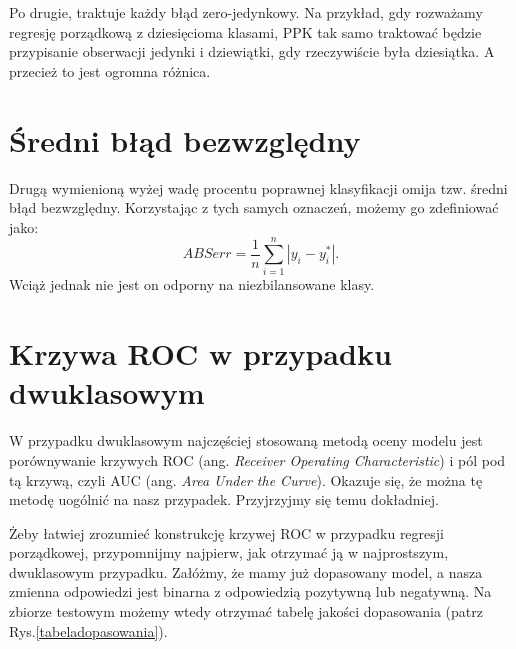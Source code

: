 \documentclass{mini}
\begin{document}
Po drugie, traktuje każdy błąd zero-jedynkowy. Na przykład, gdy rozważamy regresję porządkową z dziesięcioma klasami, PPK tak samo traktować będzie przypisanie obserwacji jedynki i dziewiątki, gdy rzeczywiście była dziesiątka. A przecież to jest ogromna różnica.

\section{Średni błąd bezwzględny}

Drugą wymienioną wyżej wadę procentu poprawnej klasyfikacji omija tzw. średni błąd bezwzględny. Korzystając z tych samych oznaczeń, możemy go zdefiniować jako:
\begin{equation}\label{dop2}
ABSerr = \frac{1}{n}\sum_{i=1}^n | y_i - y^\ast_i |. 
\end{equation}
Wciąż jednak nie jest on odporny na niezbilansowane klasy. 

\section{Krzywa ROC w przypadku dwuklasowym}

W przypadku dwuklasowym najczęściej stosowaną metodą oceny modelu jest porównywanie krzywych ROC (ang. \textit{Receiver Operating Characteristic}) i pól pod tą krzywą, czyli AUC (ang. \textit{Area Under the Curve}). Okazuje się, że można tę metodę uogólnić na nasz przypadek. Przyjrzyjmy się temu dokładniej. 

Żeby łatwiej zrozumieć konstrukcję krzywej ROC w przypadku regresji porządkowej, przypomnijmy najpierw, jak otrzymać ją w najprostszym, dwuklasowym przypadku. Załóżmy, że mamy już dopasowany model, a nasza zmienna odpowiedzi jest binarna z odpowiedzią pozytywną lub negatywną. Na zbiorze testowym możemy wtedy otrzymać tabelę jakości dopasowania (patrz Rys.\ref{tabeladopasowania}).
\end{document}
